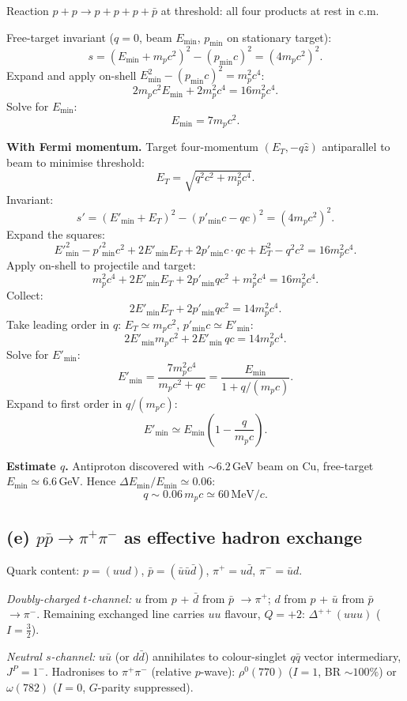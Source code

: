 \documentclass[11pt]{article}
\begin{document}
Reaction $p+p\to p+p+p+\bar p$ at threshold: all four products at rest in c.m.

Free-target invariant ($q=0$, beam $E_\mathrm{min}$, $p_\mathrm{min}$ on stationary target):
\[
s=(E_\mathrm{min}+m_p c^2)^2-(p_\mathrm{min} c)^2=(4m_p c^2)^2.
\]
Expand and apply on-shell $E_\mathrm{min}^2-(p_\mathrm{min}c)^2=m_p^2c^4$:
\[
2 m_p c^2 E_\mathrm{min} + 2 m_p^2 c^4 = 16 m_p^2 c^4.
\]
Solve for $E_\mathrm{min}$:
\[
E_\mathrm{min}=7 m_p c^2.
\]

\textbf{With Fermi momentum.} Target four-momentum $(E_T,-q\hat z)$ antiparallel to beam to minimise threshold:
\[
E_T=\sqrt{q^2c^2+m_p^2c^4}.
\]
Invariant:
\[
s'=(E'_\mathrm{min}+E_T)^2-(p'_\mathrm{min}c-qc)^2=(4m_p c^2)^2.
\]
Expand the squares:
\[
E'^2_\mathrm{min}-p'^2_\mathrm{min}c^2+2E'_\mathrm{min}E_T+2p'_\mathrm{min}c\cdot qc+E_T^2-q^2c^2=16 m_p^2 c^4.
\]
Apply on-shell to projectile and target:
\[
m_p^2c^4 + 2E'_\mathrm{min}E_T+2p'_\mathrm{min}qc^2 + m_p^2c^4=16 m_p^2 c^4.
\]
Collect:
\[
2E'_\mathrm{min}E_T+2p'_\mathrm{min}qc^2 = 14 m_p^2 c^4.
\]
Take leading order in $q$: $E_T\simeq m_p c^2$, $p'_\mathrm{min}c\simeq E'_\mathrm{min}$:
\[
2E'_\mathrm{min}m_p c^2+2E'_\mathrm{min}\,qc = 14 m_p^2 c^4.
\]
Solve for $E'_\mathrm{min}$:
\[
E'_\mathrm{min}=\frac{7 m_p^2 c^4}{m_p c^2+qc}=\frac{E_\mathrm{min}}{1+q/(m_p c)}.
\]
Expand to first order in $q/(m_p c)$:
\[
\boxed{\;E'_\mathrm{min}\simeq E_\mathrm{min}\left(1-\frac{q}{m_p c}\right).\;}
\]

\textbf{Estimate $q$.} Antiproton discovered with $\sim 6.2$\,GeV beam on Cu, free-target $E_\mathrm{min}\simeq 6.6$\,GeV. Hence $\Delta E_\mathrm{min}/E_\mathrm{min}\simeq 0.06$:
\[
\boxed{\;q\sim 0.06\,m_p c\simeq 60\,\mathrm{MeV}/c.\;}
\]

\subsection*{(e) $p\bar p\to\pi^+\pi^-$ as effective hadron exchange}

Quark content: $p=(uud)$, $\bar p=(\bar u\bar u\bar d)$, $\pi^+=u\bar d$, $\pi^-=\bar u d$.

\emph{Doubly-charged $t$-channel:} $u$ from $p$ + $\bar d$ from $\bar p$ $\to\pi^+$; $d$ from $p$ + $\bar u$ from $\bar p$ $\to\pi^-$. Remaining exchanged line carries $uu$ flavour, $Q=+2$: $\boxed{\Delta^{++}(uuu)}$ ($I=\tfrac32$).

\emph{Neutral $s$-channel:} $u\bar u$ (or $d\bar d$) annihilates to colour-singlet $q\bar q$ vector intermediary, $J^P=1^-$. Hadronises to $\pi^+\pi^-$ (relative $p$-wave): $\boxed{\rho^0(770)}$ ($I=1$, BR $\sim 100\%$) or $\boxed{\omega(782)}$ ($I=0$, $G$-parity suppressed).
\end{document}
